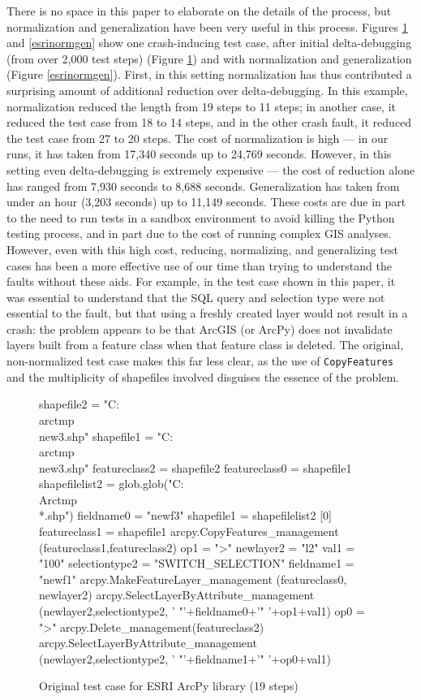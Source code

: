 There is no space in this paper to elaborate on the details of the
process, but normalization and generalization have been very useful in
this process.  Figures \ref{esriorig} and \ref{esrinormgen} show one
crash-inducing test case, after initial delta-debugging (from over
2,000 test steps) (Figure \ref{esriorig}) and with normalization and
generalization (Figure \ref{esrinormgen}).  First, in this setting
normalization has thus contributed a surprising amount of additional
reduction over delta-debugging.  In this example, normalization
reduced the length from 19 steps to 11 steps; in another case, it
reduced the test case from 18 to 14 steps, and in the other crash
fault, it reduced the test case from 27 to 20 steps.  The cost of
normalization is high --- in our runs, it has taken from 17,340
seconds up to 24,769 seconds.  However, in this setting even
delta-debugging is extremely expensive --- the cost of reduction alone
has ranged from 7,930 seconds to 8,688 seconds.  Generalization has
taken from under an hour (3,203 seconds) up to 11,149 seconds.  These
costs are due in part to the need to run tests in a sandbox
environment to avoid killing the Python testing process, and in part
due to the cost of running complex GIS analyses.  However, even with
this high cost, reducing, normalizing, and generalizing test cases has
been a more effective use of our time than trying to understand the
faults without these aids.  For example, in the test case shown in
this paper, it was essential to understand that the SQL query and
selection type were not essential to the fault, but that using a
freshly created layer would not result in a crash:  the problem
appears to be that ArcGIS (or ArcPy) does not invalidate layers built
from a feature class when that feature class is deleted.  The
original, non-normalized test case makes this far less clear, as the
use of {\tt CopyFeatures} and the multiplicity of shapefiles involved
disguises the essence of the problem.

\begin{figure}
{\scriptsize 
\begin{code}
shapefile2 = "C:\\arctmp\\new3.shp" 
shapefile1 = "C:\\arctmp\\new3.shp" 
featureclass2 = shapefile2 
featureclass0 = shapefile1 
shapefilelist2 = 
   glob.glob("C:\\Arctmp\\*.shp") 
fieldname0 = "newf3" 
shapefile1 = shapefilelist2 [0] 
featureclass1 = shapefile1 
arcpy.CopyFeatures\_management
   (featureclass1,featureclass2) 
op1 = ">" 
newlayer2 = "l2" 
val1 = "100" 
selectiontype2 = "SWITCH\_SELECTION" 
fieldname1 = "newf1" 
arcpy.MakeFeatureLayer\_management
   (featureclass0, newlayer2) 
arcpy.SelectLayerByAttribute\_management
   (newlayer2,selectiontype2,
   ' "'+fieldname0+'" '+op1+val1) 
op0 = ">" 
arcpy.Delete\_management(featureclass2) 
arcpy.SelectLayerByAttribute\_management
   (newlayer2,selectiontype2,
   ' "'+fieldname1+'" '+op0+val1) 
\end{code}
}
\caption{Original test case for ESRI ArcPy library (19 steps)}
\label{esriorig}
\end{figure}

